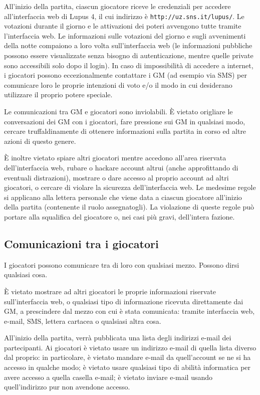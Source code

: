 \documentclass[a4paper,10pt]{article}
\begin{document}
All'inizio della partita, ciascun giocatore riceve le credenziali per accedere
all'interfaccia web di Lupus 4, il cui indirizzo è
\verb|http://uz.sns.it/lupus/|.
Le votazioni durante il giorno e le attivazioni dei poteri avvengono tutte
tramite l'interfaccia web. Le informazioni sulle votazioni del giorno e sugli
avvenimenti della notte compaiono a loro volta sull'interfaccia web (le
informazioni pubbliche possono essere visualizzate senza bisogno di
autenticazione, mentre quelle private sono accessibili solo dopo il login).
In caso di impossibilità di accedere a internet, i giocatori possono
eccezionalmente contattare i GM (ad esempio via SMS) per comunicare loro le proprie
intenzioni di voto e/o il modo in cui desiderano utilizzare il proprio potere
speciale.

Le comunicazioni tra GM e giocatori sono inviolabili. È vietato origliare le
conversazioni dei GM con i giocatori, fare pressione sui GM in qualsiasi modo,
cercare truffaldinamente di ottenere informazioni sulla partita in corso ed altre azioni di
questo genere.

È inoltre vietato spiare altri giocatori mentre accedono all'area riservata
dell'interfaccia web, rubare o hackare account altrui (anche approfittando di
eventuali distrazioni), mostrare o dare accesso al proprio account ad altri
giocatori, o cercare di violare la sicurezza dell'interfaccia web.
Le medesime regole si applicano alla lettera personale che viene data a ciascun
giocatore all'inizio della partita (contenente il ruolo assegnatogli).
La violazione di queste regole può portare alla squalifica del giocatore o, nei
casi più gravi, dell'intera fazione.


\subsection{Comunicazioni tra i giocatori}

I giocatori possono comunicare tra di loro con qualsiasi mezzo. Possono dirsi
qualsiasi cosa.

È vietato mostrare ad altri giocatori le proprie informazioni riservate sull'interfaccia web, o qualsiasi
tipo di informazione ricevuta direttamente dai GM, a prescindere dal mezzo con 
cui è stata comunicata: tramite interfaccia web, e-mail, SMS, lettera cartacea
o qualsiasi altra cosa.

All'inizio della partita, verrà pubblicata una lista degli indirizzi e-mail dei
partecipanti. Ai giocatori è vietato usare un indirizzo e-mail
di quella lista diverso dal proprio: in particolare, è vietato mandare e-mail da
quell'account se ne si ha accesso in qualche modo; è vietato
usare qualsiasi tipo di abilità informatica per avere accesso a quella casella
e-mail; è vietato inviare e-mail usando quell'indirizzo pur non
avendone accesso.
\end{document}
